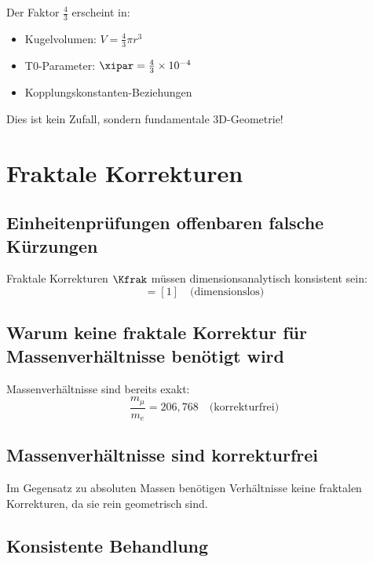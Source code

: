 	Der Faktor $\frac{4}{3}$ erscheint in:
	\begin{itemize}
		\item Kugelvolumen: $V = \frac{4}{3}\pi r^3$
		\item T0-Parameter: $\xipar = \frac{4}{3} \times 10^{-4}$
		\item Kopplungskonstanten-Beziehungen
	\end{itemize}
	
	Dies ist kein Zufall, sondern fundamentale 3D-Geometrie!
	
	\section{Fraktale Korrekturen}
	\label{sec:fractal_corrections}
	
	\subsection{Einheitenprüfungen offenbaren falsche Kürzungen}
	
	Fraktale Korrekturen $\Kfrak$ müssen dimensionsanalytisch konsistent sein:
	\begin{equation}
		[\Kfrak] = [1] \quad \text{(dimensionslos)}
	\end{equation}
	
	\subsection{Warum keine fraktale Korrektur für Massenverhältnisse benötigt wird}
	
	Massenverhältnisse sind bereits exakt:
	\begin{equation}
		\frac{m_\mu}{m_e} = 206{,}768 \quad \text{(korrekturfrei)}
	\end{equation}
	
	\subsection{Massenverhältnisse sind korrekturfrei}
	
	Im Gegensatz zu absoluten Massen benötigen Verhältnisse keine fraktalen Korrekturen, da sie rein geometrisch sind.
	
	\subsection{Konsistente Behandlung}
	
